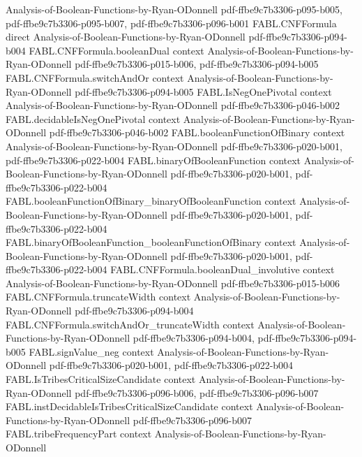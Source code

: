 \begin{theorem}
  {Analysis-of-Boolean-Functions-by-Ryan-ODonnell}
  {pdf-ffbe9c7b3306-p095-b005,
    pdf-ffbe9c7b3306-p095-b007,
    pdf-ffbe9c7b3306-p096-b001}
\proofstep
  {FABL.CNFFormula}
  {direct}
  {Analysis-of-Boolean-Functions-by-Ryan-ODonnell}
  {pdf-ffbe9c7b3306-p094-b004}
\proofstep
  {FABL.CNFFormula.booleanDual}
  {context}
  {Analysis-of-Boolean-Functions-by-Ryan-ODonnell}
  {pdf-ffbe9c7b3306-p015-b006,
    pdf-ffbe9c7b3306-p094-b005}
\proofstep
  {FABL.CNFFormula.switchAndOr}
  {context}
  {Analysis-of-Boolean-Functions-by-Ryan-ODonnell}
  {pdf-ffbe9c7b3306-p094-b005}
\proofstep
  {FABL.IsNegOnePivotal}
  {context}
  {Analysis-of-Boolean-Functions-by-Ryan-ODonnell}
  {pdf-ffbe9c7b3306-p046-b002}
\proofstep
  {FABL.decidableIsNegOnePivotal}
  {context}
  {Analysis-of-Boolean-Functions-by-Ryan-ODonnell}
  {pdf-ffbe9c7b3306-p046-b002}
\proofstep
  {FABL.booleanFunctionOfBinary}
  {context}
  {Analysis-of-Boolean-Functions-by-Ryan-ODonnell}
  {pdf-ffbe9c7b3306-p020-b001,
    pdf-ffbe9c7b3306-p022-b004}
\proofstep
  {FABL.binaryOfBooleanFunction}
  {context}
  {Analysis-of-Boolean-Functions-by-Ryan-ODonnell}
  {pdf-ffbe9c7b3306-p020-b001,
    pdf-ffbe9c7b3306-p022-b004}
\proofstep
  {FABL.booleanFunctionOfBinary_binaryOfBooleanFunction}
  {context}
  {Analysis-of-Boolean-Functions-by-Ryan-ODonnell}
  {pdf-ffbe9c7b3306-p020-b001,
    pdf-ffbe9c7b3306-p022-b004}
\proofstep
  {FABL.binaryOfBooleanFunction_booleanFunctionOfBinary}
  {context}
  {Analysis-of-Boolean-Functions-by-Ryan-ODonnell}
  {pdf-ffbe9c7b3306-p020-b001,
    pdf-ffbe9c7b3306-p022-b004}
\proofstep
  {FABL.CNFFormula.booleanDual_involutive}
  {context}
  {Analysis-of-Boolean-Functions-by-Ryan-ODonnell}
  {pdf-ffbe9c7b3306-p015-b006}
\proofstep
  {FABL.CNFFormula.truncateWidth}
  {context}
  {Analysis-of-Boolean-Functions-by-Ryan-ODonnell}
  {pdf-ffbe9c7b3306-p094-b004}
\proofstep
  {FABL.CNFFormula.switchAndOr_truncateWidth}
  {context}
  {Analysis-of-Boolean-Functions-by-Ryan-ODonnell}
  {pdf-ffbe9c7b3306-p094-b004,
    pdf-ffbe9c7b3306-p094-b005}
\proofstep
  {FABL.signValue_neg}
  {context}
  {Analysis-of-Boolean-Functions-by-Ryan-ODonnell}
  {pdf-ffbe9c7b3306-p020-b001,
    pdf-ffbe9c7b3306-p022-b004}
\proofstep
  {FABL.IsTribesCriticalSizeCandidate}
  {context}
  {Analysis-of-Boolean-Functions-by-Ryan-ODonnell}
  {pdf-ffbe9c7b3306-p096-b006,
    pdf-ffbe9c7b3306-p096-b007}
\proofstep
  {FABL.instDecidableIsTribesCriticalSizeCandidate}
  {context}
  {Analysis-of-Boolean-Functions-by-Ryan-ODonnell}
  {pdf-ffbe9c7b3306-p096-b007}
\proofstep
  {FABL.tribeFrequencyPart}
  {context}
  {Analysis-of-Boolean-Functions-by-Ryan-ODonnell}

\end{theorem}
